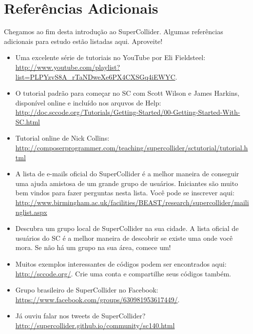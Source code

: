 \section{Referências Adicionais}

Chegamos ao fim desta introdução ao SuperCollider. Algumas referências adicionais para estudo estão listadas aqui. Aproveite!

\begin{itemize}
\item Uma excelente série de tutoriais no YouTube por Eli Fieldsteel: \url{http://www.youtube.com/playlist?list=PLPYzvS8A_rTaNDweXe6PX4CXSGq4iEWYC}. 

\item O tutorial padrão para começar no SC com Scott Wilson e James Harkins, disponível online e incluído nos arquvos de Help:  
\url{http://doc.sccode.org/Tutorials/Getting-Started/00-Getting-Started-With-SC.html}

\item Tutorial online de Nick Collins: \url{http://composerprogrammer.com/teaching/supercollider/sctutorial/tutorial.html}
 
\item A lista de e-mails oficial do SuperCollider é a melhor maneira de conseguir uma ajuda amistosa de um grande grupo de usuários. Iniciantes são muito bem vindos para fazer perguntas nesta lista. Você pode se inscrever aqui: \url{http://www.birmingham.ac.uk/facilities/BEAST/research/supercollider/mailinglist.aspx}

\item Descubra um grupo local de SuperCollider na sua cidade. A lista oficial de usuários do SC é a melhor maneira de descobrir se existe uma onde você mora. Se não há um grupo na sua área, comece um!

\item Muitos exemplos interessantes de códigos podem ser encontrados aqui: \url{http://sccode.org/}. Crie uma conta e compartilhe seus códigos também.

\item Grupo brasileiro de SuperCollider no Facebook: \url{https://www.facebook.com/groups/630981953617449/}.

\item Já ouviu falar nos tweets de SuperCollider? \url{http://supercollider.github.io/community/sc140.html}

\end{itemize}
